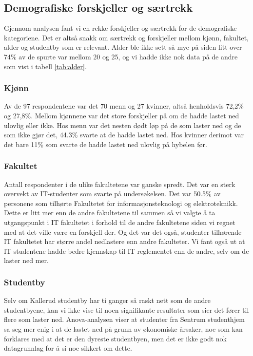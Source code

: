 \subsection{Demografiske forskjeller og særtrekk}
Gjennom analysen fant vi en rekke forskjeller og særtrekk for de demografiske kategoriene. Det er altså snakk om særtrekk og forskjeller mellom kjønn, fakultet, alder og studentby som er relevant. Alder ble ikke sett så mye på siden litt over 74\% av de spurte var mellom 20 og 25, og vi hadde ikke nok data på de andre som vist i tabell \ref{tab:alder}. 

\subsubsection{Kjønn}
Av de 97 respondentene var det 70 menn og 27 kvinner, altså henholdsvis 72,2\% og 27,8\%. Mellom kjønnene var det store forskjeller på om de hadde lastet ned ulovlig eller ikke. Hos menn var det nesten dødt løp på de som laster ned og de som ikke gjør det, 44.3\% svarte at de hadde lastet ned. Hos kvinner derimot var det bare 11\% som svarte de hadde lastet ned ulovlig på hybelen før. 

\subsubsection{Fakultet}
Antall respondenter i de ulike fakultetene var ganske spredt. Det var en sterk overvekt av IT-studenter som svarte på undersøkelsen. Det var 50.5\% av personene som tilhørte Fakultetet for informasjonsteknologi og elektroteknikk. Dette er litt mer enn de andre fakultetene til sammen så vi valgte å ta utgangspunkt i IT fakultetet i forhold til de andre fakultetene siden vi regnet med at det ville være en forskjell der. Og det var det også, studenter tilhørende IT fakultetet har større andel nedlastere enn andre fakulteter. Vi fant også ut at IT studentene hadde bedre kjennskap til IT reglementet enn de andre, selv om de laster ned mer.

\subsubsection{Studentby}
Selv om Kallerud studentby har ti ganger så raskt nett som de andre studentbyene, kan vi ikke vise til noen signifikante resultater som sier det fører til flere som laster ned. Anova-analysen viser at studenter fra Sentrum studenthjem sa seg mer enig i at de lastet ned på grunn av økonomiske årsaker, noe som kan forklares med at det er den dyreste studentbyen, men det er ikke godt nok datagrunnlag for å si noe sikkert om dette. 


